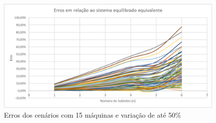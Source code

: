 \begin{figure}[!ht]
    \centering
    \includegraphics[width=12cm]{Resultados/Figuras/e15_50}
    \caption{Erros dos cenários com 15 máquinas e variação de até 50\%}
    \label{fig:e15_50}
\end{figure}